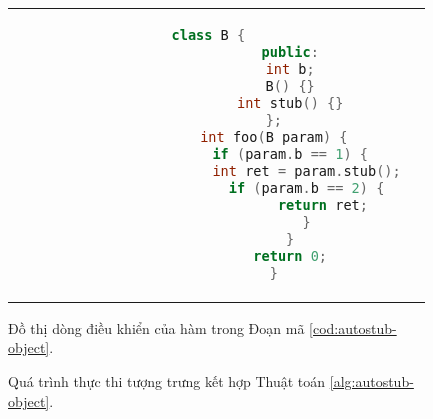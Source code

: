 \begin{figure}[h]
	\begin{tabular}{cc}
		\begin{minipage}[b]{0.5\textwidth}
			\begin{lstlisting}[language=C++, caption={Mã nguồn minh họa phương pháp tạo stub tự động cho phương thức của đối tượng.}, label={cod:autostub-object}, captionpos=b]
				class B {
					public:
					int b;
					B() {}
					int stub() {}
				};
				int foo(B param) {
					if (param.b == 1) {
						int ret = param.stub();
						if (param.b == 2) {
							return ret;
						}
					}
					return 0;
				}
			\end{lstlisting}
		\end{minipage}
		& \begin{minipage}[b]{0.4\textwidth}
			\centering
			
			\caption{Đồ thị dòng điều khiển của hàm \tcode{foo(B param)} trong Đoạn mã \autoref{cod:autostub-object}.}
			\label{fig:cfg-object}
		\end{minipage}
	\end{tabular}
\end{figure}

\begin{figure}[h]
	\centering
	
	\caption{Quá trình thực thi tượng trưng kết hợp Thuật toán \autoref{alg:autostub-object}.}
	\label{fig:autostub-sample}
\end{figure}

